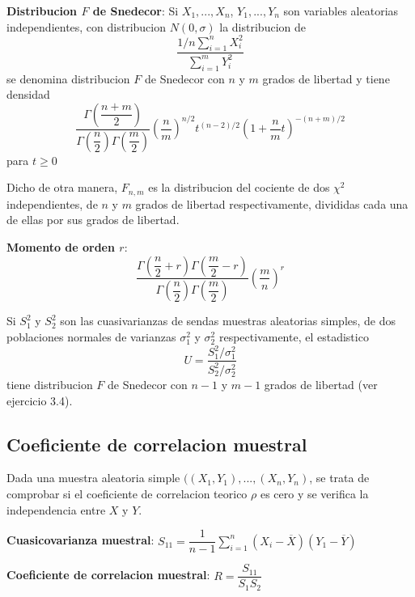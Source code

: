 \documentclass[10pt]{extarticle}
\newcommand{\<}{\langle}
\renewcommand{\>}{\rangle}
\theoremstyle{definition}
\begin{document}
\textbf{Distribucion $F$ de Snedecor}: Si $X_1, ..., X_n$, $Y_1, ..., Y_n$ son variables aleatorias independientes, con distribucion $N(0,\sigma)$ la distribucion de
\begin{equation*}
  \dfrac{1/n \sum_{i=1}^n X_i^2}{\sum_{i=1}^m Y_i^2}
\end{equation*}
se denomina distribucion $F$ de Snedecor con $n$ y $m$ grados de libertad y tiene densidad
\begin{equation*}
  \dfrac{\Gamma(\dfrac{n+m}{2})}{\Gamma(\dfrac{n}{2})\Gamma(\dfrac{m}{2})} (\dfrac{n}{m})^{n/2} t^{(n-2)/2} (1+\dfrac{n}{m}t)^{-(n+m)/2}
\end{equation*}
para $t \geq 0$

Dicho de otra manera, $F_{n,m}$ es la distribucion del cociente de dos $\chi^2$ independientes, de $n$ y $m$ grados de libertad respectivamente, divididas cada una de ellas por sus grados de libertad.

\textbf{Momento de orden $r$}:
\begin{equation*}
  \dfrac{\Gamma(\dfrac{n}{2}+r) \Gamma(\dfrac{m}{2} -r)}{\Gamma(\dfrac{n}{2}) \Gamma(\dfrac{m}{2})} (\dfrac{m}{n})^r
\end{equation*}

\begin{theorem*}
  Si $S_1^2$ y $S_2^2$ son las cuasivarianzas de sendas muestras aleatorias simples, de dos poblaciones normales de varianzas $\sigma_1^2$ y $\sigma_2^2$ respectivamente, el estadistico
  \begin{equation*}
    U=\dfrac{S_1^2/\sigma_1^2}{S_2^2/\sigma_2^2}
  \end{equation*}
  tiene distribucion $F$ de Snedecor con $n-1$ y $m-1$ grados de libertad (ver ejercicio 3.4).
\end{theorem*}

\subsection*{Coeficiente de correlacion muestral}

Dada una muestra aleatoria simple $((X_1, Y_1),..., (X_n, Y_n)$, se trata de comprobar si el coeficiente de correlacion teorico $\rho$ es cero y se verifica la independencia entre $X$ y $Y$.

\textbf{Cuasicovarianza muestral}: $S_{11}=\dfrac{1}{n-1}\sum_{i=1}^n (X_i-\overline{X})(Y_1-\overline{Y})$

\textbf{Coeficiente de correlacion muestral}: $R = \dfrac{S_{11}}{S_1S_2}$
\end{document}
